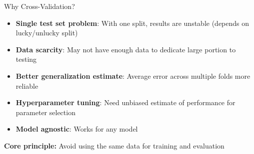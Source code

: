 \documentclass[11pt]{beamer}
\begin{document}
\begin{frame}[fragile]{Why Cross-Validation?}
	\begin{itemize}
		\setlength{\itemsep}{0.3cm}
		\item \textbf{Single test set problem}: With one split, results are unstable (depends on lucky/unlucky split)
		\item \textbf{Data scarcity}: May not have enough data to dedicate large portion to testing
		\item \textbf{Better generalization estimate}: Average error across multiple folds more reliable
		\item \textbf{Hyperparameter tuning}: Need unbiased estimate of performance for parameter selection
		\item \textbf{Model agnostic}: Works for any model
	\end{itemize}

	\vspace{0.3cm}

	\textbf{Core principle:} Avoid using the same data for training and evaluation
\end{frame}
\end{document}
